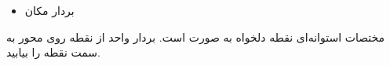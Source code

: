 \begin{ELunit}

\begin{itemize}
\tightlist
\item
  بردار مکان
\end{itemize}



\end{ELunit}


\begin{ELexample}{}

مختصات استوانه‌ای نقطه دلخواه  به صورت  است. بردار واحد از نقطه  روی محور  به سمت نقطه  را بیابید.

\begin{ELsolution}



\end{ELsolution}

\end{ELexample}

